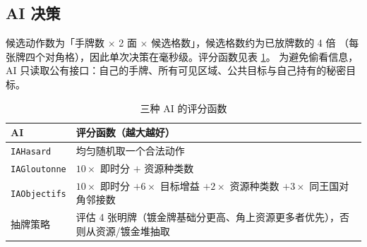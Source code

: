 \documentclass[11pt,a4paper]{ctexart}
\newcommand{\cl}[1]{\texttt{#1}}
\begin{document}
\subsection{AI 决策}
候选动作数为「手牌数 $\times$ 2 面 $\times$ 候选格数」，候选格数约为已放牌数的 4 倍
（每张牌四个对角格），因此单次决策在毫秒级。评分函数见表 \ref{tab:ia}。
为避免偷看信息，AI 只读取公有接口：自己的手牌、所有可见区域、公共目标与自己持有的秘密目标。

\begin{table}[h]
\centering
\small
\begin{tabular}{p{3.2cm}p{9.6cm}}
\toprule
AI & 评分函数（越大越好） \\
\midrule
\cl{IAHasard} & 均匀随机取一个合法动作 \\
\cl{IAGloutonne} & $10 \times$ 即时分 $+$ 资源种类数 \\
\cl{IAObjectifs} & $10 \times$ 即时分 $+ 6 \times$ 目标增益 $+ 2 \times$ 资源种类数 $+ 3 \times$ 同王国对角邻接数 \\
抽牌策略 & 评估 4 张明牌（镀金牌基础分更高、角上资源更多者优先），否则从资源/镀金堆抽取 \\
\bottomrule
\end{tabular}
\caption{三种 AI 的评分函数}
\label{tab:ia}
\end{table}
\end{document}

